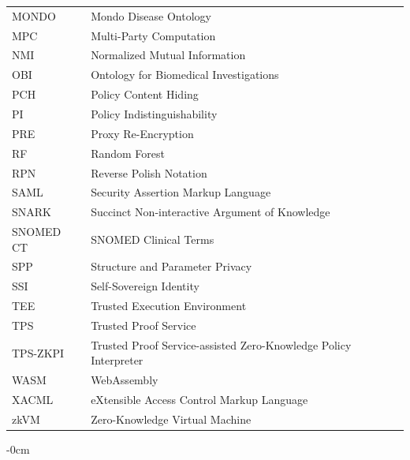 \documentclass[blockchains,article,submit,moreauthors]{Definitions/mdpi}
\DeclareRobustCommand{\_}{\textunderscore\discretionary{}{}{}}
\begin{document}
{\begin{longtable}{@{}ll@{}}
		MONDO     & Mondo Disease Ontology                                           \\
		MPC       & Multi-Party Computation                                          \\
		NMI       & Normalized Mutual Information                                    \\
		OBI       & Ontology for Biomedical Investigations                           \\
		PCH       & Policy Content Hiding                                            \\
		PI        & Policy Indistinguishability                                      \\
		PRE       & Proxy Re-Encryption                                              \\
		RF        & Random Forest                                                    \\
		RPN       & Reverse Polish Notation                                          \\
		SAML      & Security Assertion Markup Language                               \\
		SNARK     & Succinct Non-interactive Argument of Knowledge                   \\
		SNOMED CT & SNOMED Clinical Terms                                            \\
		SPP       & Structure and Parameter Privacy                                  \\
		SSI       & Self-Sovereign Identity                                          \\
		TEE       & Trusted Execution Environment                                    \\
		TPS       & Trusted Proof Service                                            \\
		TPS-ZKPI  & Trusted Proof Service-assisted Zero-Knowledge Policy Interpreter \\
		WASM      & WebAssembly                                                      \\
		XACML     & eXtensible Access Control Markup Language                        \\
		zkVM      & Zero-Knowledge Virtual Machine                                   \\
	\end{longtable}
}

\appendixstart
\appendix


\FloatBarrier

\begin{adjustwidth}{-\extralength}{0cm}

	

	\PublishersNote{}
\end{adjustwidth}
\end{document}

